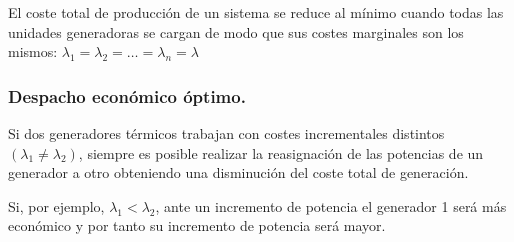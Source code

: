 				El coste total de producción de un sistema se reduce al mínimo cuando todas las unidades generadoras se cargan de modo que sus costes marginales son los mismos: $\lambda_1 = \lambda_2 = \dots = \lambda_n = \lambda$
				
				
			\subsubsection{Despacho económico óptimo.}
				Si dos generadores térmicos trabajan con costes incrementales distintos $(\lambda_1 \neq \lambda_2)$, siempre es posible realizar la reasignación de las potencias de un generador a otro obteniendo una disminución del coste total de generación.
				
				
				Si, por ejemplo, $\lambda_1 < \lambda_2$, ante un incremento de potencia el generador 1 será más económico y por tanto su incremento de potencia será mayor.
				
